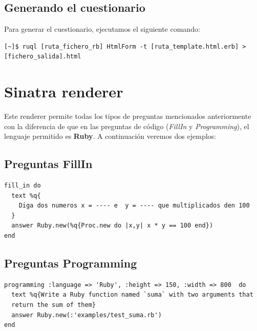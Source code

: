 \subsection{Generando el cuestionario}
\label{subsec:Apendice2.10}

Para generar el cuestionario, ejecutamos el siguiente comando:
\begin{verbatim}
[~]$ ruql [ruta_fichero_rb] HtmlForm -t [ruta_template.html.erb] > [fichero_salida].html
\end{verbatim}

\section{Sinatra renderer}
\label{Apendice2:sinatra}

Este renderer permite todas los tipos de preguntas mencionados anteriormente con la diferencia de que en las preguntas de c\'odigo (\textit{FillIn} y \textit{Programming}), 
el lenguaje permitido es {\bfseries Ruby}. A continuaci\'on veremos dos ejemplos:

\subsection{Preguntas FillIn}
\label{subsec:Apendice2.11}

\begin{verbatim}
fill_in do
  text %q{
    Diga dos numeros x = ---- e  y = ---- que multiplicados den 100
  }
  answer Ruby.new(%q{Proc.new do |x,y| x * y == 100 end})
end
\end{verbatim}

\subsection{Preguntas Programming}
\label{subsec:Apendice2.11}

\begin{verbatim}
programming :language => 'Ruby', :height => 150, :width => 800  do
  text %q{Write a Ruby function named `suma` with two arguments that 
  return the sum of them}
  answer Ruby.new(:'examples/test_suma.rb')
end
\end{verbatim}

